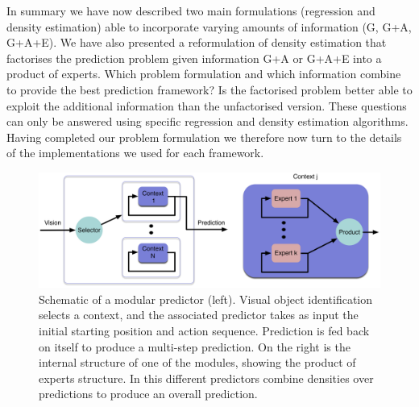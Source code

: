 In summary we have now described two main formulations (regression and density estimation) able to incorporate varying amounts of information (G, G+A, G+A+E). We have also presented a reformulation of density estimation that factorises the prediction problem given information G+A or G+A+E into a product of experts. Which problem formulation and which information combine to provide the best prediction framework?
Is the factorised problem better able to exploit the additional
information than the unfactorised version. These questions can only be
answered using specific regression and density estimation
algorithms. Having completed our problem formulation we therefore now
turn to the details of the implementations we used for each framework.

\begin{figure}[t]
\centerline{\includegraphics[width=\columnwidth]{modular-predictor}}
\caption[Modular Prediction]{Schematic of a modular predictor (left). Visual object identification selects a context, and the associated predictor takes as input the initial starting position and action sequence. Prediction is fed back on itself to produce a multi-step prediction. On the right is the internal structure of one of the modules, showing the product of experts structure. In this different predictors combine densities over predictions to produce an overall prediction.
}
\label{fig:modular}
\end{figure}

